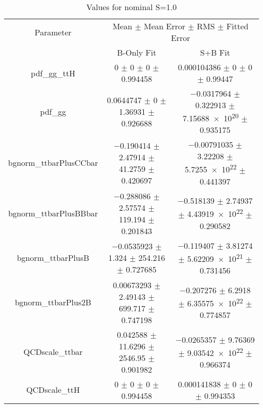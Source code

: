 \begin{table}
\centering
\caption{Values for nominal S=1.0}
\begin{tabular}{ccc}
\toprule
Parameter & \multicolumn{2}{c}{Mean $\pm$ Mean Error $\pm$ RMS $\pm$ Fitted Error}\\
 & B-Only Fit & S+B Fit\\
\midrule
pdf\_gg\_ttH & \num{0} $\pm$ \num{0} $\pm$ \num{0} $\pm$ \num{0.994458} & \num{0.000104386} $\pm$ \num{0} $\pm$ \num{0} $\pm$ \num{0.99447}\\
pdf\_gg & \num{0.0644747} $\pm$ \num{0} $\pm$ \num{1.36931} $\pm$ \num{0.926688} & \num{-0.0317964} $\pm$ \num{0.322913} $\pm$ \num{7.15688e+20} $\pm$ \num{0.935175}\\
bgnorm\_ttbarPlusCCbar & \num{-0.190414} $\pm$ \num{2.47914} $\pm$ \num{41.2759} $\pm$ \num{0.420697} & \num{-0.00791035} $\pm$ \num{3.22208} $\pm$ \num{5.7255e+22} $\pm$ \num{0.441397}\\
bgnorm\_ttbarPlusBBbar & \num{-0.288086} $\pm$ \num{2.57574} $\pm$ \num{119.194} $\pm$ \num{0.201843} & \num{-0.518139} $\pm$ \num{2.74937} $\pm$ \num{4.43919e+22} $\pm$ \num{0.290582}\\
bgnorm\_ttbarPlusB & \num{-0.0535923} $\pm$ \num{1.324} $\pm$ \num{254.216} $\pm$ \num{0.727685} & \num{-0.119407} $\pm$ \num{3.81274} $\pm$ \num{5.62209e+21} $\pm$ \num{0.731456}\\
bgnorm\_ttbarPlus2B & \num{0.00673293} $\pm$ \num{2.49143} $\pm$ \num{699.717} $\pm$ \num{0.747198} & \num{-0.207276} $\pm$ \num{6.2918} $\pm$ \num{6.35575e+22} $\pm$ \num{0.774857}\\
QCDscale\_ttbar & \num{0.042588} $\pm$ \num{11.6296} $\pm$ \num{2546.95} $\pm$ \num{0.901982} & \num{-0.0265357} $\pm$ \num{9.76369} $\pm$ \num{9.03542e+22} $\pm$ \num{0.966374}\\
QCDscale\_ttH & \num{0} $\pm$ \num{0} $\pm$ \num{0} $\pm$ \num{0.994458} & \num{0.000141838} $\pm$ \num{0} $\pm$ \num{0} $\pm$ \num{0.994353}\\
\bottomrule
\end{tabular}
\end{table}